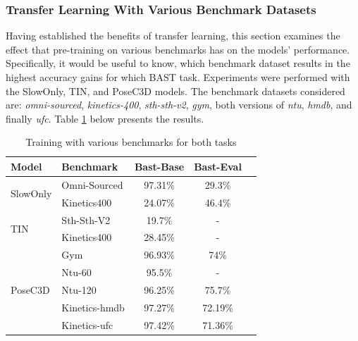 \documentclass[extern,palatino]{cgMA}
\begin{document}
\subsubsection{Transfer Learning With Various Benchmark Datasets}
\label{research_question_4_2}

Having established the benefits of transfer learning, this section examines the effect that pre-training on various benchmarks has on the models' performance. Specifically, it would be useful to know, which benchmark dataset results in the highest accuracy gains for which BAST task. Experiments were performed with the SlowOnly, TIN, and PoseC3D models. The benchmark datasets considered are: \textit{omni-sourced}, \textit{kinetics-400}, \textit{sth-sth-v2}, \textit{gym}, both versions of \textit{ntu}, \textit{hmdb}, and finally \textit{ufc}. Table \ref{tab:research_question_4_2} below presents the results.

\begin{table}[h!]
    \begin{center}
    \caption{Training with various benchmarks for both tasks}
    \label{tab:research_question_4_2}
    \begin{tabular}{l|l|c|c|c}
      \textbf{Model} & \textbf{Benchmark} & \textbf{Bast-Base} & \textbf{Bast-Eval}\\
      \hline
       \multirow{2}{*}{SlowOnly} & Omni-Sourced & 97.31\% & 29.3\% \\
       & Kinetics400 & 24.07\% & 46.4\%\\
       \hline
       \multirow{2}{*}{TIN} & Sth-Sth-V2 & 19.7\% & -\\
       & Kinetics400 & 28.45\% & -\\
       \hline
       \multirow{5}{*}{PoseC3D} & Gym & 96.93\% & 74\% \\
       & Ntu-60 & 95.5\% & -\\
       & Ntu-120 &  96.25\% & 75.7\%\\
       & Kinetics-hmdb &  97.27\% & 72.19\%\\
       & Kinetics-ufc &  97.42\% & 71.36\%\\
       \hline
    \end{tabular}
  \end{center}
\end{table}
\end{document}
